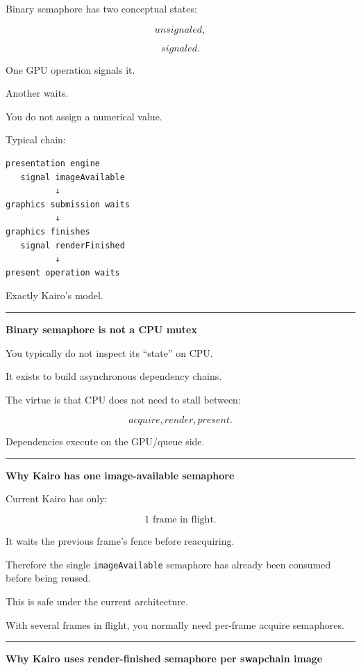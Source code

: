 Binary semaphore has two conceptual states:

\[
unsignaled,
\]

\[
signaled.
\]

One GPU operation signals it.

Another waits.

You do not assign a numerical value.

Typical chain:

\begin{verbatim}
presentation engine
   signal imageAvailable
          ↓
graphics submission waits
          ↓
graphics finishes
   signal renderFinished
          ↓
present operation waits
\end{verbatim}

Exactly Kairo's model.

\begin{center}\rule{0.5\linewidth}{0.5pt}\end{center}

\textbf{Binary semaphore is not a CPU mutex}

You typically do not inspect its ``state'' on CPU.

It exists to build asynchronous dependency chains.

The virtue is that CPU does not need to stall between:

\[
acquire,
render,
present.
\]

Dependencies execute on the GPU/queue side.

\begin{center}\rule{0.5\linewidth}{0.5pt}\end{center}

\textbf{Why Kairo has one image-available semaphore}

Current Kairo has only:

\[
1\text{ frame in flight}.
\]

It waits the previous frame's fence before reacquiring.

Therefore the single \texttt{imageAvailable} semaphore has already been consumed before being reused.

This is safe under the current architecture.

With several frames in flight, you normally need per-frame acquire semaphores.

\begin{center}\rule{0.5\linewidth}{0.5pt}\end{center}

\textbf{Why Kairo uses render-finished semaphore per swapchain image}

